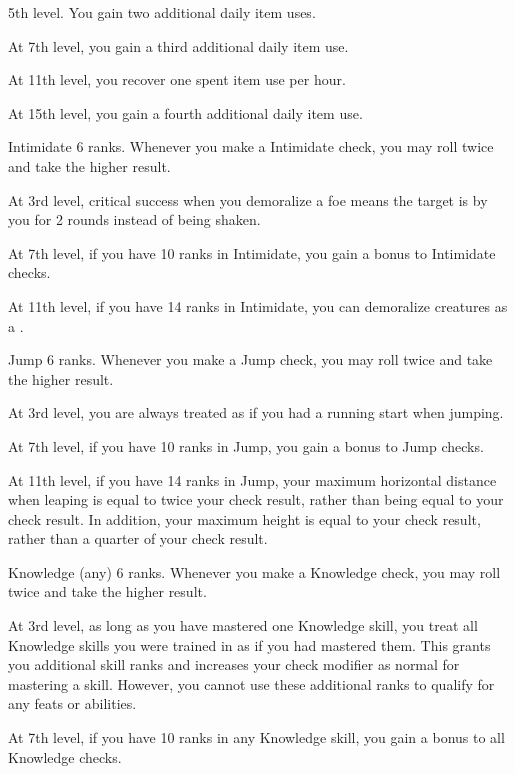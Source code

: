     \featpre 5th level.
    \featben You gain two additional daily item uses.

    At 7th level, you gain a third additional daily item use.

    At 11th level, you recover one spent item use per hour.

    At 15th level, you gain a fourth additional daily item use.

    \featpre Intimidate 6 ranks.
    \featben Whenever you make a Intimidate check, you may roll twice and take the higher result.

    At 3rd level, critical success when you demoralize a foe means the target is \frightened by you for 2 rounds instead of being shaken.

    At 7th level, if you have 10 ranks in Intimidate, you gain a  bonus to Intimidate checks.

    At 11th level, if you have 14 ranks in Intimidate, you can demoralize creatures as a .

    \featpre Jump 6 ranks.
    \featben Whenever you make a Jump check, you may roll twice and take the higher result.

    At 3rd level, you are always treated as if you had a running start when jumping.

    At 7th level, if you have 10 ranks in Jump, you gain a  bonus to Jump checks.

    At 11th level, if you have 14 ranks in Jump, your maximum horizontal distance when leaping is equal to twice your check result, rather than being equal to your check result.
    In addition, your maximum height is equal to your check result, rather than a quarter of your check result.

    \featpre Knowledge (any) 6 ranks.
    \featben Whenever you make a Knowledge check, you may roll twice and take the higher result.

    At 3rd level, as long as you have mastered one Knowledge skill, you treat all Knowledge skills you were trained in as if you had mastered them.
    This grants you additional skill ranks and increases your check modifier as normal for mastering a skill.
    However, you cannot use these additional ranks to qualify for any feats or abilities.

    At 7th level, if you have 10 ranks in any Knowledge skill, you gain a  bonus to all Knowledge checks.

